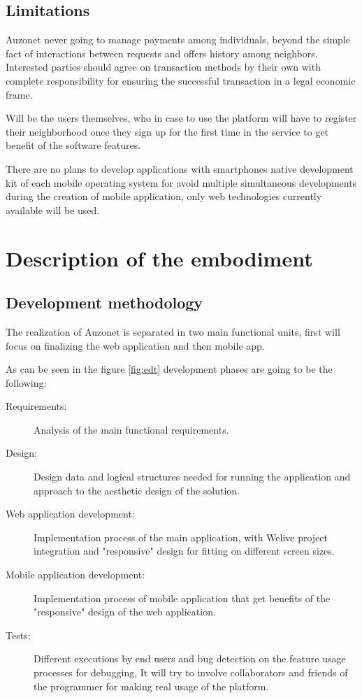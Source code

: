 \documentclass{DeustoFDP}
\begin{document}
\subsection{Limitations}
Auzonet never going to manage payments among individuals, beyond the simple fact of interactions between requests and offers history among neighbors. Interested parties should agree on transaction methods by their own with complete responsibility for ensuring the successful transaction in a legal economic frame.

Will be the users themselves, who in case to use the platform will have to register their neighborhood once they sign up for the first time in the service to get benefit of the software features.

There are no plans to develop applications with smartphones native development kit of each mobile operating system for avoid multiple simultaneous developments during the creation of  mobile application, only web technologies currently available will be used.

\section{Description of the embodiment}
\subsection{Development methodology}
The realization of Auzonet is separated in two main functional units, first will focus on finalizing the web application and then mobile app.

As can be seen in the figure \ref{fig:edt} development phases are going to be the following:
\begin{description}
	\item[Requirements:] Analysis of the main functional requirements.
	\item[Design:] Design data and logical structures needed for running the application and approach to the aesthetic design of the solution.
	\item[Web application development:] Implementation process of the main application, with Welive project integration and "responsive" design for fitting on different screen sizes.
	\item[Mobile application development:] Implementation process of mobile application that get benefits of the "responsive" design of the web application.
	\item[Tests:] Different executions by end users and bug detection on the feature usage processes for debugging, It will try to involve collaborators and friends of the programmer for making real usage of the platform.
\end{description}
\end{document}

